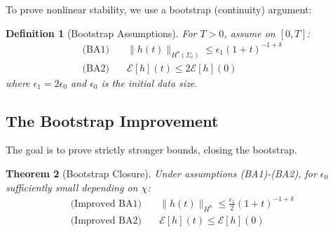 \documentclass[12pt,a4paper]{article}
\newtheorem{theorem}{Theorem}[section]
\newtheorem{definition}[theorem]{Definition}
\begin{document}
To prove nonlinear stability, we use a bootstrap (continuity) argument:

\begin{definition}[Bootstrap Assumptions]
For $T > 0$, assume on $[0, T]$:
\begin{align}
\text{(BA1)} &\quad \|h(t)\|_{H^8(\Sigma_t)} \leq \epsilon_1 (1+t)^{-1+\delta} \\
\text{(BA2)} &\quad \mathcal{E}[h](t) \leq 2\mathcal{E}[h](0)
\end{align}
where $\epsilon_1 = 2\epsilon_0$ and $\epsilon_0$ is the initial data size.
\end{definition}

\subsection{The Bootstrap Improvement}

The goal is to prove strictly stronger bounds, closing the bootstrap.

\begin{theorem}[Bootstrap Closure]\label{thm:bootstrap}
Under assumptions (BA1)-(BA2), for $\epsilon_0$ sufficiently small depending on $\chi$:
\begin{align}
\text{(Improved BA1)} &\quad \|h(t)\|_{H^8} \leq \frac{\epsilon_1}{2}(1+t)^{-1+\delta} \\
\text{(Improved BA2)} &\quad \mathcal{E}[h](t) \leq \mathcal{E}[h](0)
\end{align}
\end{theorem}
\end{document}
